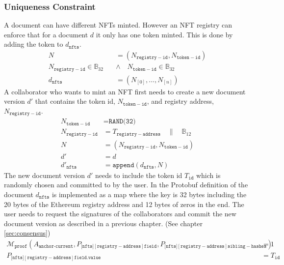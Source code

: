 \subsubsection{Uniqueness Constraint}
A document can have different NFTs minted. However an NFT registry can enforce that for a document $d$ it only has one token minted. This is done by adding the token to $d_{\mathtt{nfts}}$. 
\begin{equation}
\begin{split}
N & = (N_{\mathtt{registry-id}}, N_{\mathtt{token-id}}) \\
N_{\mathtt{registry-id}} \in \mathbb{B}_{32}  \quad &\land \quad N_{\mathtt{token-id}} \in \mathbb{B}_{32}  \\
d_{\mathtt{nfts}}& = (N_{[0]},...,N_{[n]})
\end{split}
\end{equation}
A collaborator who wants to mint an NFT first needs to create a new document version $d'$ that contains the token id, $N_{\mathtt{token-id}}$, and registry address, $N_{\mathtt{registry-id}}$.
\begin{equation}
\begin{split}
N_{\mathtt{token-id}} & = \texttt{RAND(32)}\\
N_{\mathtt{registry-id}} & = T_{\mathtt{registry-address}} \quad \| \quad \mathbb{B}_{12} \\
N  & = (N_{\mathtt{registry-id}}, N_{\mathtt{token-id}}) \\
d' & = d \\
d'_{\mathtt{nfts}} & = \texttt{append}(d_{\mathtt{nfts}}, N)
\end{split}
\end{equation}
The new document version $d'$ needs to include the token id $T_{\mathtt{id}}$ which is randomly chosen and committed to by the user. 
In the Protobuf definition of the document $d_{\mathtt{nfts}}$ is implemented as a map where the key is 32 bytes including the 20 bytes of the Ethereum registry address and 12 bytes of zeros in the end. The user needs to request the signatures of the collaborators and commit the new document version as described in a previous chapter. (See chapter \ref{sec:consensus})
\begin{equation}
\begin{split}
\mathcal{M}_{\texttt{proof}}(A_{\texttt{anchor-current}} ,P_{[\mathtt{nfts]{[registry-address]}}\mathtt{field}},P_{[\mathtt{nfts]{[registry-address]}}\mathtt{sibling-hashes}}) &= 1 \\
P_{[\mathtt{nfts]{[registry-address]}}\mathtt{field.value}} &= T_{\mathtt{id}}
\end{split}
\end{equation}
